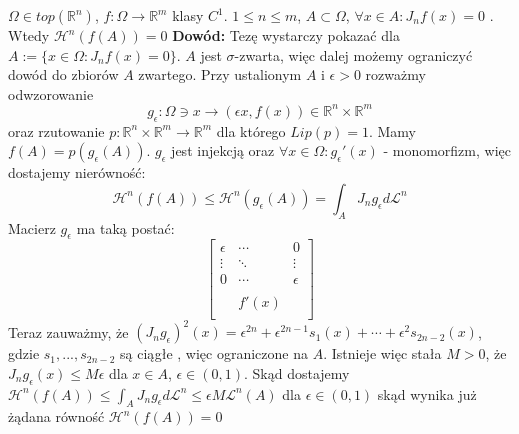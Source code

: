 \begin{lem}
	$\Omega \in top(\mathbb{R}^n)$, $f: \Omega \rightarrow \mathbb{R}^m$ klasy $C^1$. $1 \leq n \leq m$, $A \subset \Omega$, $\forall x \in A: J_nf(x) = 0$ . Wtedy $\mathcal{H}^n(f(A))=0$
	\newline
	\textbf{Dowód:}\newline
	Tezę wystarczy pokazać dla $A:=\{x \in \Omega: J_nf(x)=0\}$. $A$ jest $\sigma$-zwarta, więc dalej możemy ograniczyć dowód do zbiorów $A$ zwartego. Przy ustalionym $A$ i $\epsilon > 0$ rozważmy odwzorowanie $$
		g_{\epsilon}: \Omega \ni x \rightarrow (\epsilon x, f(x)) \in \mathbb{R}^n \times \mathbb{R}^m
	$$
	oraz rzutowanie $p: \mathbb{R}^n \times \mathbb{R}^m \rightarrow \mathbb{R}^m$ dla którego $Lip(p) = 1$. Mamy $f(A) = p(g_{\epsilon}(A))$. $g_{\epsilon}$ jest injekcją oraz $\forall x \in \Omega: g_{\epsilon}'(x)$ - monomorfizm, więc  dostajemy nierówność: $$
		\mathcal{H}^n(f(A)) \leq \mathcal{H}^n(g_{\epsilon}(A)) = \int_{A} J_ng_{\epsilon} d \mathcal{L}^n
	$$ Macierz $g_{\epsilon}$ ma taką postać: $$
		\begin{bmatrix}
			\epsilon & \cdots & 0 \\
			\vdots & \ddots & \vdots \\
			0 & \cdots & \epsilon \\
			& & \\
			& f'(x) & \\
			& &
		\end{bmatrix}
	$$
	Teraz zauważmy, że $(J_ng_{\epsilon})^2(x) = \epsilon^{2n} + \epsilon^{2n-1}s_1(x) + \cdots + \epsilon^2s_{2n-2}(x)$, gdzie $s_1, ..., s_{2n-2}$ są ciągłe , więc ograniczone na $A$. Istnieje więc stała $M>0$, że $J_ng_{\epsilon}(x)\leq M\epsilon$ dla $x \in A$, $\epsilon \in (0,1)$. Skąd dostajemy $\mathcal{H}^n(f(A)) \leq \int_{A} J_ng_{\epsilon} d \mathcal{L}^n \leq \epsilon M \mathcal{L}^n(A)$ dla $\epsilon \in (0,1)$ skąd wynika już żądana równość $\mathcal{H}^n(f(A)) = 0$ 
\end{lem}